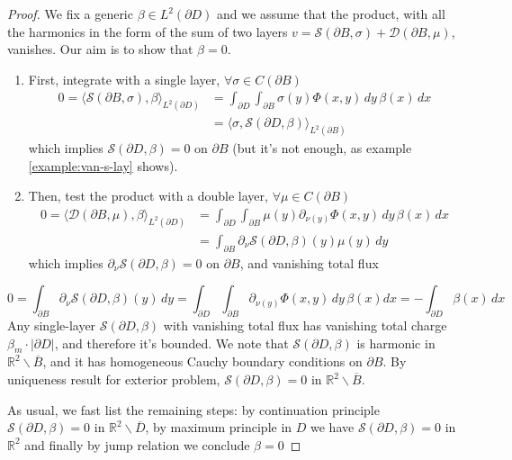 \documentclass[10pt, a4paper, twoside, openright]{book}
\theoremstyle{definition}
\theoremstyle{plain}
\theoremstyle{plain}
\theoremstyle{plain}
\theoremstyle{plain}
\theoremstyle{plain}
\theoremstyle{plain}
\theoremstyle{plain}
\theoremstyle{plain}
\begin{document}
\begin{proof}
 We fix a generic $\beta \in L^2(\partial D)$ and we assume that the product, with all the harmonics in the form of the sum of two layers $v=\mathcal{S}(\partial B,\sigma) + \mathcal{D}(\partial B, \mu)$, vanishes. Our aim is to show that $\beta=0$.
 \begin{enumerate}
  \item First, integrate with a single layer, $\forall\sigma\in C(\partial B)$
 \begin{align*}
  0=\langle\mathcal{S}({\partial B},\sigma), \beta\rangle_{L^2(\partial D)} &= \int_{\partial D} \int_{\partial B} \sigma(y) \Phi(x,y)\,dy\,\beta(x)\,dx \\ &= \langle\sigma, \mathcal{S}({\partial D},\beta)\rangle_{L^2(\partial B)}
 \end{align*}
 which implies $\mathcal{S}(\partial D,\beta) = 0$ on $\partial B$ (but it's not enough, as example \ref{example:van-s-lay} shows).
 \item Then, test the product with a double layer, $\forall \mu\in C(\partial B)$
 \begin{align*}
  0=\langle\mathcal{D}({\partial B},\mu), \beta\rangle_{L^2(\partial D)} &= \int_{\partial D} \int_{\partial B} \mu(y) \partial_{\nu(y)}\Phi(x,y)\,dy\,\beta(x)\,dx \\&= \int_{\partial B} \partial_\nu \mathcal{S}(\partial D, \beta)(y) \mu(y)\, dy
 \end{align*}
 which implies $\partial_\nu \mathcal{S}(\partial D, \beta) = 0$ on $\partial B$, and vanishing total flux
 \end{enumerate}
 \begin{equation*}
  0=\int_{\partial B} \partial_\nu \mathcal{S}(\partial D,\beta)(y)\,dy =\int_{\partial D} \int_{\partial B} \partial_{\nu(y)} \Phi(x,y)\, dy \, \beta(x) dx = - \int_{\partial D} \beta(x) \, dx
 \end{equation*}
 Any single-layer $\mathcal{S}(\partial D, \beta)$ with vanishing total flux has vanishing total charge $\beta_m\cdot |\partial D|$, and therefore it's bounded. 
 We note that $\mathcal{S}(\partial D, \beta)$ is harmonic in $\mathbb{R}^2\backslash\overline{B}$, and it has homogeneous Cauchy boundary conditions on $\partial B$.
 By uniqueness result for exterior problem, $\mathcal{S}(\partial D,\beta) = 0$ in $\mathbb{R}^2\backslash\overline{B}$. 
 \par
 As usual, we fast list the remaining steps: by continuation principle $\mathcal{S}(\partial D,\beta) = 0$ in $\mathbb{R}^2\backslash\overline{D}$,
 by maximum principle in $D$ we have $\mathcal{S}(\partial D,\beta) = 0$ in $\mathbb{R}^2$ 
 and finally by jump relation we conclude $\beta = 0$
\end{proof}
\end{document}
